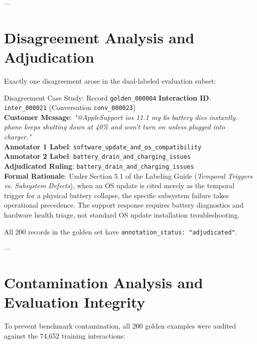 \documentclass[11pt,a4paper]{article}
\begin{document}
---

\section{Disagreement Analysis and Adjudication}

Exactly one disagreement arose in the dual-labeled evaluation subset:

\begin{evidencebox}{Disagreement Case Study: Record \texttt{golden\_000004}}
\textbf{Interaction ID}: \texttt{inter\_000021} (Conversation \texttt{conv\_000023}) \\
\textbf{Customer Message}: \textit{"@AppleSupport ios 11.1 my 6s battery dies instantly. phone keeps shutting down at 40\% and won't turn on unless plugged into charger."} \\
\textbf{Annotator 1 Label}: \texttt{software\_update\_and\_os\_compatibility} \\
\textbf{Annotator 2 Label}: \texttt{battery\_drain\_and\_charging\_issues} \\
\textbf{Adjudicated Ruling}: \texttt{battery\_drain\_and\_charging\_issues} \\
\textbf{Formal Rationale}: Under Section 5.1 of the Labeling Guide (\textit{Temporal Triggers vs. Subsystem Defects}), when an OS update is cited merely as the temporal trigger for a physical battery collapse, the specific subsystem failure takes operational precedence. The support response requires battery diagnostics and hardware health triage, not standard OS update installation troubleshooting.
\end{evidencebox}

All 200 records in the golden set have \texttt{annotation\_status: "adjudicated"}.

---

\section{Contamination Analysis and Evaluation Integrity}

To prevent benchmark contamination, all 200 golden examples were audited against the 74,652 training interactions:
\end{document}
